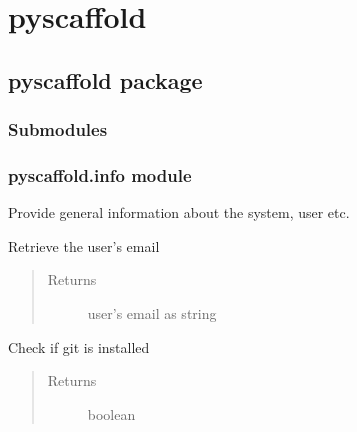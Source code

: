\documentclass[letterpaper,10pt,english]{sphinxmanual}
\begin{document}
\section{pyscaffold}
\label{_rst/modules:pyscaffold}\label{_rst/modules::doc}

\subsection{pyscaffold package}
\label{_rst/pyscaffold::doc}\label{_rst/pyscaffold:pyscaffold-package}

\subsubsection{Submodules}
\label{_rst/pyscaffold:submodules}

\subsubsection{pyscaffold.info module}
\label{_rst/pyscaffold:module-pyscaffold.info}\label{_rst/pyscaffold:pyscaffold-info-module}
Provide general information about the system, user etc.

\begin{fulllineitems}
\label{_rst/pyscaffold:pyscaffold.info.email}
Retrieve the user's email
\begin{quote}\begin{description}
\item[{Returns}] \leavevmode
user's email as string

\end{description}\end{quote}

\end{fulllineitems}


\begin{fulllineitems}
\label{_rst/pyscaffold:pyscaffold.info.is_git_installed}
Check if git is installed
\begin{quote}\begin{description}
\item[{Returns}] \leavevmode
boolean

\end{description}\end{quote}

\end{fulllineitems}
\end{document}
